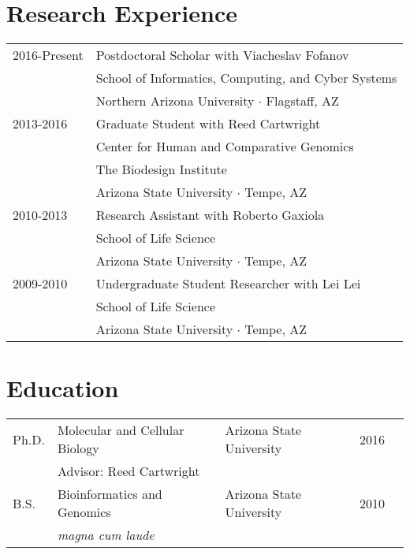 \documentclass[11pt]{article}
\begin{document}
\section*{Research Experience}
\begin{tabularx}{\linewidth}{lX}
2016-Present& Postdoctoral Scholar with Viacheslav Fofanov\\
&School of Informatics, Computing, and Cyber Systems\\ \vspace{2mm}
&Northern Arizona University $\cdotp$ Flagstaff, AZ\\
2013-2016&Graduate Student with Reed Cartwright\\
&Center for Human and Comparative Genomics\\
&The Biodesign Institute\\ \vspace{2mm}
&Arizona State University $\cdotp$ Tempe, AZ\\ 
2010-2013&Research Assistant with Roberto Gaxiola\\
&School of Life Science\\ \vspace{2mm}
&Arizona State University $\cdotp$ Tempe, AZ\\ 
2009-2010&Undergraduate Student Researcher with Lei Lei\\
&School of Life Science\\
&Arizona State University $\cdotp$ Tempe, AZ\\
\end{tabularx}



\section*{Education}
\begin{tabular}[c]{lllll}
Ph.D.& Molecular and Cellular Biology& Arizona State University&2016\\
&\multicolumn{3}{l}{Advisor: Reed Cartwright}\\
B.S.&Bioinformatics and Genomics&Arizona State University& 2010\\
&\multicolumn{3}{l}{\textit{magna cum laude}}
\end{tabular}
\end{document}
